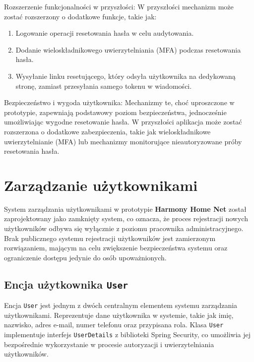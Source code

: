 Rozszerzenie funkcjonalności w przyszłości:
W przyszłości mechanizm może zostać rozszerzony o dodatkowe funkcje, takie jak:
\begin{enumerate}
    \item Logowanie operacji resetowania hasła w celu audytowania.
    \item Dodanie wieloskładnikowego uwierzytelniania (MFA) podczas resetowania hasła.
    \item Wysyłanie linku resetującego, który odsyła użytkownika na dedykowaną stronę, zamiast przesyłania samego tokenu w wiadomości.
\end{enumerate}

Bezpieczeństwo i wygoda użytkownika: 
Mechanizmy te, choć uproszczone w prototypie, zapewniają podstawowy poziom bezpieczeństwa, jednocześnie umożliwiając wygodne resetowanie hasła. W przyszłości aplikacja może zostać rozszerzona o dodatkowe zabezpieczenia, takie jak wieloskładnikowe uwierzytelnianie (MFA) lub mechanizmy monitorujące nieautoryzowane próby resetowania hasła.


\section{Zarządzanie użytkownikami}

System zarządzania użytkownikami w prototypie \textbf{Harmony Home Net} został zaprojektowany jako zamknięty system, co oznacza, że proces rejestracji nowych użytkowników odbywa się wyłącznie z poziomu pracownika administracyjnego. Brak publicznego systemu rejestracji użytkowników jest zamierzonym rozwiązaniem, mającym na celu zwiększenie bezpieczeństwa systemu oraz ograniczenie dostępu jedynie do osób upoważnionych. 

\subsection{Encja użytkownika \texttt{User}}

Encja \texttt{User} jest jednym z dwóch centralnym elementem systemu zarządzania użytkownikami. Reprezentuje dane użytkownika w systemie, takie jak imię, nazwisko, adres e-mail, numer telefonu oraz przypisana rola. Klasa \texttt{User} implementuje interfejs \texttt{UserDetails} z biblioteki Spring Security, co umożliwia jej bezpośrednie wykorzystanie w procesie autoryzacji i uwierzytelniania użytkowników.

